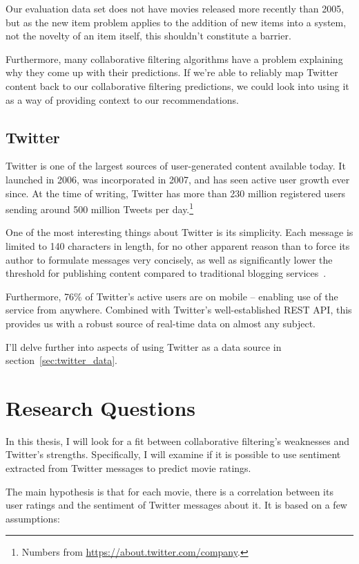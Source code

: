 Our evaluation data set does not have movies released more recently than 2005, but as the new item problem applies to the addition of new items into a system, not the novelty of an item itself, this shouldn't constitute a barrier.

Furthermore, many collaborative filtering algorithms have a problem explaining why they come up with their predictions. If we're able to reliably map Twitter content back to our collaborative filtering predictions, we could look into using it as a way of providing context to our recommendations.

\subsection{Twitter}

Twitter is one of the largest sources of user-generated content available today. It launched in 2006, was incorporated in 2007, and has seen active user growth ever since. At the time of writing, Twitter has more than 230 million registered users sending around 500 million Tweets per day.\footnote{Numbers from \url{https://about.twitter.com/company}.}

One of the most interesting things about Twitter is its simplicity. Each message is limited to 140 characters in length, for no other apparent reason than to force its author to formulate messages very concisely, as well as significantly lower the threshold for publishing content compared to traditional blogging services~\cite{Java:2007:WWT:1348549.1348556}.

Furthermore, 76\% of Twitter's active users are on mobile -- enabling use of the service from anywhere. Combined with Twitter's well-established REST API, this provides us with a robust source of real-time data on almost any subject.

I'll delve further into aspects of using Twitter as a data source in section~\ref{sec:twitter_data}.

\section{Research Questions}

In this thesis, I will look for a fit between collaborative filtering's weaknesses and Twitter's strengths. Specifically, I will examine if it is possible to use sentiment extracted from Twitter messages to predict movie ratings.

The main hypothesis is that for each movie, there is a correlation between its user ratings and the sentiment of Twitter messages about it. It is based on a few assumptions:

